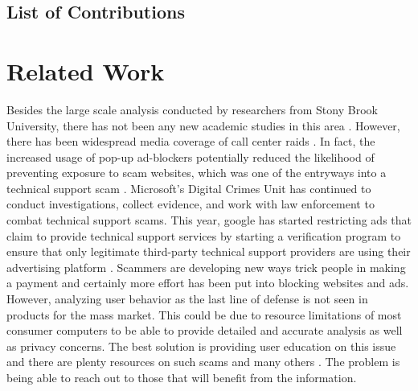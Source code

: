 \documentclass[final]{IEEEtran}
\begin{document}


\subsection{List of Contributions}


\section{Related Work} %
Besides the large scale analysis conducted by researchers from Stony Brook University, there has not been any new academic studies in this area \cite{b2}. However, there has been widespread media coverage of call center raids \cite{b6}. In fact, the increased usage of pop-up ad-blockers potentially reduced the likelihood  of preventing exposure to scam websites, which was one of the entryways into a technical support scam \cite{b7}. Microsoft's Digital Crimes Unit has continued to conduct investigations, collect evidence, and work with law enforcement to combat technical support scams. This year, google has started restricting ads that claim to provide technical support services by starting a verification program to ensure that only legitimate third-party technical support providers are using their advertising platform \cite{b8}. Scammers are developing new ways trick people in making a payment and certainly more effort has been put into blocking websites and ads. However, analyzing user behavior as the last line of defense is not seen in products for the mass market. This could be due to resource limitations of most consumer computers to be able to provide detailed and accurate analysis as well as privacy concerns. The best solution is providing user education on this issue and there are plenty resources on such scams and many others \cite{b10}. The problem is being able to reach out to those that will benefit from the information.
\end{document}

